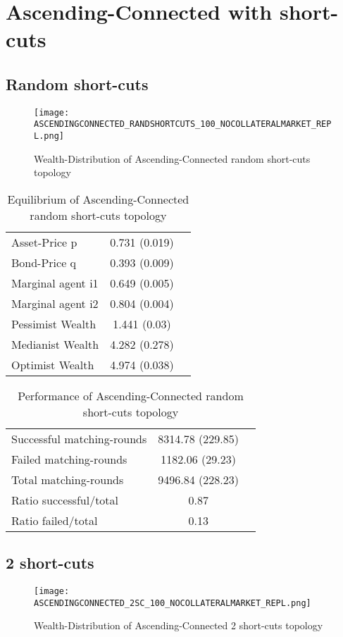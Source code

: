 \documentclass[Bachelorarbeit.tex]{subfiles}
\begin{document}
\section{Ascending-Connected with short-cuts}

\subsection{Random short-cuts}
\begin{figure}[H]
	\centering
  \texttt{[image: ASCENDINGCONNECTED\_RANDSHORTCUTS\_100\_NOCOLLATERALMARKET\_REPL.png]}
	\caption{Wealth-Distribution of Ascending-Connected random short-cuts topology}
	\label{fig:wealth_ASCENDINGCONNECTED_RANDSHORTCUTS_100_NOCOLLATERALMARKET_REPL}
\end{figure}

\begin{table}[H]
	\caption{Equilibrium of Ascending-Connected random short-cuts topology}
	\centering
	\begin{tabular} { l c r }
		\hline
		Asset-Price p & 0.731 (0.019) \\
		Bond-Price q & 0.393 (0.009) \\
		Marginal agent i1 & 0.649 (0.005) \\
		Marginal agent i2 & 0.804 (0.004) \\
		\hline
		Pessimist Wealth & 1.441 (0.03) \\
		Medianist Wealth & 4.282 (0.278) \\
		Optimist Wealth & 4.974 (0.038) \\
		\hline
	\end{tabular}
\end{table} 

\begin{table}[H]
	\caption{Performance of Ascending-Connected random short-cuts topology}
	\centering
	\begin{tabular} { l c r }
		\hline
		Successful matching-rounds& 8314.78 (229.85) \\
		Failed matching-rounds & 1182.06 (29.23) \\
		Total matching-rounds & 9496.84 (228.23) \\
		\hline
		Ratio successful/total & 0.87 \\
		Ratio failed/total & 0.13 \\
		\hline
	\end{tabular}
\end{table}

\subsection{2 short-cuts}
\begin{figure}[H]
	\centering
  \texttt{[image: ASCENDINGCONNECTED\_2SC\_100\_NOCOLLATERALMARKET\_REPL.png]}
	\caption{Wealth-Distribution of Ascending-Connected 2 short-cuts topology}
	\label{fig:wealth_ASCENDINGCONNECTED_2SC_100_NOCOLLATERALMARKET_REPL}
\end{figure}
\end{document}

